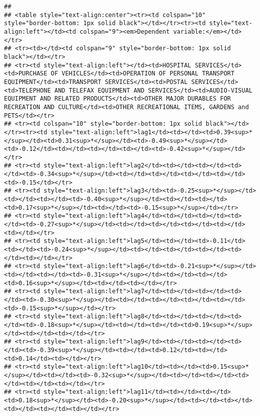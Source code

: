 \documentclass[
]{article}
\begin{document}
\begin{verbatim}
## 
## <table style="text-align:center"><tr><td colspan="10" style="border-bottom: 1px solid black"></td></tr><tr><td style="text-align:left"></td><td colspan="9"><em>Dependent variable:</em></td></tr>
## <tr><td></td><td colspan="9" style="border-bottom: 1px solid black"></td></tr>
## <tr><td style="text-align:left"></td><td>HOSPITAL SERVICES</td><td>PURCHASE OF VEHICLES</td><td>OPERATION OF PERSONAL TRANSPORT EQUIPMENT</td><td>TRANSPORT SERVICES</td><td>POSTAL SERVICES</td><td>TELEPHONE AND TELEFAX EQUIPMENT AND SERVICES</td><td>AUDIO-VISUAL EQUIPMENT AND RELATED PRODUCTS</td><td>OTHER MAJOR DURABLES FOR RECREATION AND CULTURE</td><td>OTHER RECREATIONAL ITEMS, GARDENS and PETS</td></tr>
## <tr><td colspan="10" style="border-bottom: 1px solid black"></td></tr><tr><td style="text-align:left">lag1</td><td></td><td>0.39<sup>*</sup></td><td>0.31<sup>*</sup></td><td>-0.49<sup>*</sup></td><td>-0.12</td><td></td><td></td><td></td><td>-0.42<sup>*</sup></td></tr>
## <tr><td style="text-align:left">lag2</td><td></td><td></td><td></td><td>-0.34<sup>*</sup></td><td></td><td></td><td></td><td></td><td>-0.15</td></tr>
## <tr><td style="text-align:left">lag3</td><td>-0.25<sup>*</sup></td><td></td><td></td><td>-0.40<sup>*</sup></td><td></td><td></td><td>0.17<sup>*</sup></td><td></td><td>-0.15<sup>*</sup></td></tr>
## <tr><td style="text-align:left">lag4</td><td></td><td></td><td></td><td>-0.27<sup>*</sup></td><td></td><td></td><td></td><td></td><td></td></tr>
## <tr><td style="text-align:left">lag5</td><td></td><td>-0.11</td><td></td><td>-0.24<sup>*</sup></td><td></td><td></td><td></td><td></td><td></td></tr>
## <tr><td style="text-align:left">lag6</td><td>-0.21<sup>*</sup></td><td></td><td></td><td>-0.31<sup>*</sup></td><td></td><td></td><td>0.16<sup>*</sup></td><td></td><td></td></tr>
## <tr><td style="text-align:left">lag7</td><td></td><td></td><td></td><td>-0.30<sup>*</sup></td><td></td><td></td><td></td><td></td><td>-0.15<sup>*</sup></td></tr>
## <tr><td style="text-align:left">lag8</td><td></td><td></td><td></td><td>-0.18<sup>*</sup></td><td></td><td></td><td>0.19<sup>*</sup></td><td></td><td></td></tr>
## <tr><td style="text-align:left">lag9</td><td></td><td></td><td></td><td>-0.39<sup>*</sup></td><td></td><td>0.12</td><td></td><td>0.14</td><td></td></tr>
## <tr><td style="text-align:left">lag10</td><td></td><td>0.15<sup>*</sup></td><td></td><td>-0.32<sup>*</sup></td><td></td><td></td><td></td><td></td><td></td></tr>
## <tr><td style="text-align:left">lag11</td><td></td><td></td><td>0.18<sup>*</sup></td><td>-0.20<sup>*</sup></td><td></td><td></td><td></td><td></td><td></td></tr>

\end{verbatim}
\end{document}
